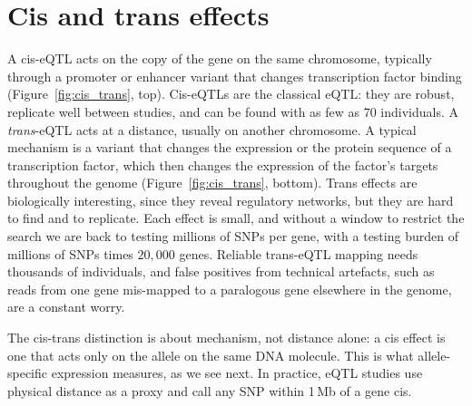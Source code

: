 \section{Cis and trans effects}

A cis-eQTL acts on the copy of the gene on the same chromosome, typically through a promoter or enhancer variant that changes transcription factor binding (Figure~\ref{fig:cis_trans}, top). Cis-eQTLs are the classical eQTL: they are robust, replicate well between studies, and can be found with as few as 70 individuals. A \emph{trans}-eQTL acts at a distance, usually on another chromosome. A typical mechanism is a variant that changes the expression or the protein sequence of a transcription factor, which then changes the expression of the factor's targets throughout the genome (Figure~\ref{fig:cis_trans}, bottom). Trans effects are biologically interesting, since they reveal regulatory networks, but they are hard to find and to replicate. Each effect is small, and without a window to restrict the search we are back to testing millions of SNPs per gene, with a testing burden of millions of SNPs times $20{,}000$ genes. Reliable trans-eQTL mapping needs thousands of individuals, and false positives from technical artefacts, such as reads from one gene mis-mapped to a paralogous gene elsewhere in the genome, are a constant worry.

The cis-trans distinction is about mechanism, not distance alone: a cis effect is one that acts only on the allele on the same DNA molecule. This is what allele-specific expression measures, as we see next. In practice, eQTL studies use physical distance as a proxy and call any SNP within 1\,Mb of a gene cis.

